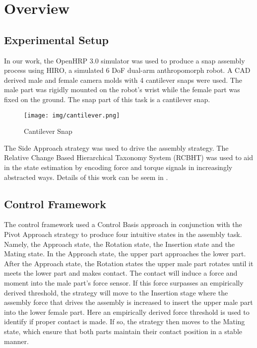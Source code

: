 %

\chapter{Overview}
\section{Experimental Setup}
In our work, the OpenHRP 3.0 simulator was used to produce a snap assembly process using HIRO, a simulated 6 DoF dual-arm anthropomorph robot. A CAD derived male and female camera molds with 4 cantilever snaps were used. The male part was rigidly mounted on the robot's wrist while the female part was fixed on the ground. The snap part of this task is a cantilever snap.\\

\begin{figure}[h]
    \centering
    \texttt{[image: img/cantilever.png]}
    \caption{Cantilever Snap}
    \label{snap}
\end{figure}

\indent The Side Approach strategy \cite{2012ICMA-Rojas-PivotApproach} was used to drive the assembly strategy. The Relative Change Based Hierarchical Taxonomy System (RCBHT) was used to aid in the state estimation by encoding force and torque signals in increasingly abstracted ways. Details of this work can be seem in \cite{2013IJMA-Rojas-TwrdsSnapSensing}.
\section{Control Framework}
The control framework used a Control Basis approach \cite{2012JAR-Rojas-AutHetBotAsmbly} in conjunction with the Pivot Approach strategy to produce four intuitive states in the assembly task. Namely, the Approach state, the Rotation state, the Insertion state and the Mating state. In the Approach state, the upper part approaches the lower part. After the Approach state, the Rotation states the upper male part rotates until it meets the lower part and makes contact. The contact will induce a force and moment into the male part's force sensor. If this force surpasses an empirically derived threshold, the strategy will move to the Insertion stage where the assembly force that drives the assembly is increased to insert the upper male part into the lower female part. Here an empirically derived force threshold is used to identify if proper contact is made. If so, the strategy then moves to the Mating state, which ensure that both parts maintain their contact position in a stable manner.\\

